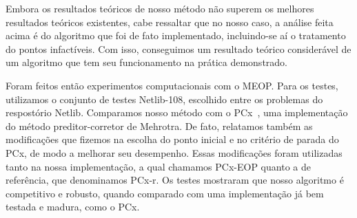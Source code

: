 Embora os resultados teóricos de nosso método  não superem os melhores resultados teóricos existentes, cabe ressaltar que no nosso caso, a análise feita acima é do algoritmo que foi de fato implementado, incluindo-se aí o tratamento do pontos infactíveis. Com isso, conseguimos um resultado teórico considerável de um algoritmo que tem seu funcionamento na prática demonstrado.



Foram feitos então experimentos computacionais com o MEOP.  Para os testes, utilizamos o conjunto de testes Netlib-108, escolhido entre os problemas do respostório Netlib. Comparamos nosso método com o PCx~\cite{Czyzyk:1999hk}, uma implementação do método preditor-corretor de Mehrotra. De fato, relatamos também as modificações que fizemos na escolha do ponto inicial e no critério de parada do PCx, de modo a melhorar seu desempenho. Essas modificações foram utilizadas tanto na nossa implementação, a qual chamamos PCx-EOP quanto a de referência, que denominamos PCx-r. Os testes mostraram que nosso algoritmo é competitivo e robusto, quando comparado com uma implementação já bem testada e madura, como o PCx. 







 
    



